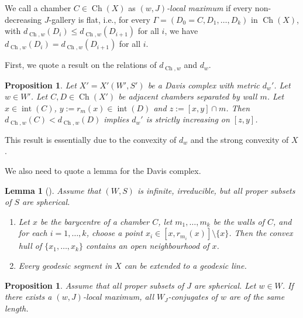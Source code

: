 \documentclass[a4paper, reqno, 14pt]{amsart}
\renewcommand{\int}{\operatorname{int}}
\DeclareMathOperator{\Ch}{Ch}
\newtheorem{prop}[thm]{Proposition}
\newtheorem{lem}[thm]{Lemma}
\theoremstyle{definition}
\theoremstyle{remark}
\numberwithin{equation}{section}
\numberwithin{thm}{section}
\begin{document}
        We call a chamber $C\in \Ch(X)$ as \emph{$(w,J)$-local maximum} if every non-decreasing $J$-gallery is flat, i.e., for every $\Gamma=(D_0=C,D_1,\dots,D_k)$ in $\Ch(X)$, with $d_{\Ch,w}(D_i)\leq d_{\Ch,w}(D_{i+1})$ for all $i$, we have $d_{\Ch,w}(D_i)= d_{\Ch,w}(D_{i+1})$ for all $i$. 

    First, we quote a result on the relations of $d_{\Ch,w}$ and $d_w$.

    \begin{prop}\cite[Proposition 4.4]{marquis2024centre}\label{prop:chamber_to_metric}
        Let $X'=X'(W',S')$ be a Davis complex with metric $d_w'$. Let $w\in W'$. Let $C,D\in \Ch(X')$ be adjacent chambers separated by wall $m$. Let $x\in \int(C)$, $y:=r_m(x)\in \int(D)$ and $z:=[x,y]\cap m$. Then $d_{\Ch,w}(C)<d_{\Ch,w}(D)$ implies $d_w'$ is strictly increasing on $[z,y]$.
    \end{prop}

    This result is essentially due to the convexity of $d_w$ and the strong convexity of $X$.

    We also need to quote a lemma for the Davis complex.
    \begin{lem}[{\cite[Lemma 2.5]{marquis2024centre}}] \label{lem:extgeod}
        Assume that $(W,S)$ is infinite, irreducible, but all proper subsets of $S$ are spherical.
        \begin{enumerate}
        \item
        Let $x$ be the barycentre of a chamber $C$, let $m_1,\dots,m_k$ be the walls of $C$, and for each $i=1,\dots,k$, choose a point $x_i\in [x,r_{m_i}(x)]\setminus \{x\}$. Then the convex hull of $\{x_1,\dots,x_k\}$ contains an open neighbourhood of $x$.
        \item 
        Every geodesic segment in $X$ can be extended to a geodesic line.
        \end{enumerate}
    \end{lem}

    \begin{prop}\label{prop:localmaximum}
        Assume that all proper subsets of $J$ are spherical. Let $w\in W$. If there exists a $(w,J)$-local maximum, all $W_J$-conjugates of $w$ are of the same length.
    \end{prop}
\end{document}
